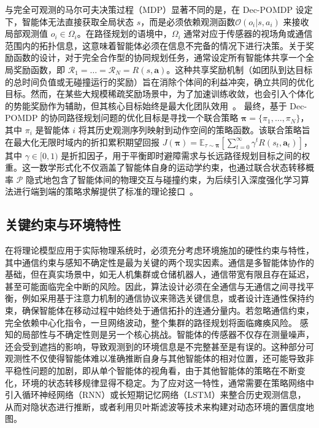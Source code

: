 \documentclass[13.5pt]{extarticle}
\begin{document}
与完全可观测的马尔可夫决策过程（MDP）显著不同的是，在 Dec-POMDP 设定下，智能体无法直接获取全局状态 $s$，而是必须依赖观测函数$\mathcal{O}(o_i|s, a_i)$ 来接收局部观测值 $o_i \in \Omega_i$。在路径规划的语境中，$\Omega_i$ 通常对应于传感器的视场角或通信范围内的拓扑信息，这意味着智能体必须在信息不完备的情况下进行决策。关于奖励函数的设计，对于完全合作型的协同规划任务，通常设定所有智能体共享一个全局奖励函数，即 $\mathcal{R}_1 = \dots = \mathcal{R}_N = R(s, \boldsymbol{a})$。这种共享奖励机制（如团队到达目标的总时间负值或无碰撞运行的奖励）旨在消除个体间的利益冲突，确立共同的优化目标。然而，在某些大规模稀疏奖励场景中，为了加速训练收敛，也会引入个体化的势能奖励作为辅助，但其核心目标始终是最大化团队效用~\cite{littman1994markov}。
最终，基于 Dec-POMDP 的协同路径规划问题的优化目标是寻找一个联合策略 $\boldsymbol{\pi} = \{\pi_1, \dots, \pi_N\}$，其中 $\pi_i$ 是智能体 $i$ 将其历史观测序列映射到动作空间的策略函数。该联合策略旨在最大化无限时域内的折扣累积期望回报 $J(\boldsymbol{\pi}) = \mathbb{E}_{\tau \sim \boldsymbol{\pi}} [\sum_{t=0}^{\infty} \gamma^t R(s_t, \boldsymbol{a}_t)]$，其中 $\gamma \in [0, 1)$ 是折扣因子，用于平衡即时避障需求与长远路径规划目标之间的权重。这一数学形式化不仅涵盖了智能体自身的运动学约束，也通过联合状态转移概率 $\mathcal{P}$ 隐式地包含了智能体间的物理交互与碰撞约束，为后续引入深度强化学习算法进行端到端的策略求解提供了标准的理论接口~\cite{sutton2018reinforcement}。

\subsection{关键约束与环境特性}

在将理论模型应用于实际物理系统时，必须充分考虑环境施加的硬性约束与特性，其中通信约束与感知不确定性是最为关键的两个现实因素。通信是多智能体协作的基础，但在真实场景中，如无人机集群或仓储机器人，通信带宽有限且存在延迟，甚至可能面临完全中断的风险。因此，算法设计必须在全通信与无通信之间寻找平衡，例如采用基于注意力机制的通信协议来筛选关键信息，或者设计连通性保持约束，确保智能体在移动过程中始终处于通信拓扑的连通分量内。若忽略通信约束，完全依赖中心化指令，一旦网络波动，整个集群的路径规划将面临瘫痪风险。
感知的局部性与不确定性则是另一个核心挑战。智能体的传感器不仅存在测量噪声，还会受到遮挡的影响，导致观测到的环境信息是不完整甚至是有误的。这种部分可观测性不仅使得智能体难以准确推断自身与其他智能体的相对位置，还可能导致非平稳性问题的加剧，即从单个智能体的视角看，由于其他智能体的策略在不断变化，环境的状态转移规律显得不稳定。为了应对这一特性，通常需要在策略网络中引入循环神经网络（RNN）或长短期记忆网络（LSTM）来整合历史观测信息，从而对隐状态进行推断，或者利用贝叶斯滤波等技术来构建对动态环境的置信度地图。
\end{document}
